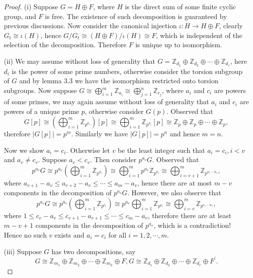 \begin{proof}
(i) Suppose $G=H\oplus F$, where $H$ is the direct sum of some finite cyclic group, and $F$ is free. The existence of such decomposition is guaranteed by previous discussions. Now consider the canonical injection $\iota:H\to H\oplus F$, clearly $G_t\cong\iota(H)$, hence $G/G_t\cong(H\oplus F)/\iota(H)\cong F$, which is independent of the selection of the decomposition. Therefore $F$ is unique up to isomorphism.\par
(ii) We may assume without loss of generality that $G=\mathbb{Z} _{d_1}\oplus \mathbb{Z} _{d_2}\oplus \cdots \oplus \mathbb{Z} _{d_r}$, here $d_i$ is the power of some prime numbers, otherwise consider the torsion subgroup of $G$ and by lemma 3.3 we have the isomorphism restricted onto torsion subgroups. Now suppose $G\cong \bigoplus_{i=1}^m{\mathbb{Z} _{a_i}}\cong \bigoplus_{j=1}^n{\mathbb{Z} _{c_j}}$, where $a_i$ and $c_i$ are powers of some primes, we may again assume without loss of generality that $a_i$ and $c_i$ are powers of a unique prime $p$, otherwise consider $G(p)$. Observed that 
$$
G\left[ p \right] \cong \left( \bigoplus_{i=1}^m{\mathbb{Z} _{p^{a_i}}} \right) \left[ p \right] \cong \bigoplus_{i=1}^m{\mathbb{Z} _{p^{a_i}}\left[ p \right]}\cong \mathbb{Z} _p\oplus \mathbb{Z} _p\oplus \cdots \oplus \mathbb{Z} _p,
$$
therefore $|G[p]|=p^m$. Similarly we have $|G[p]|=p^n$ and hence $m=n$.\par
Now we show $a_i=c_i$. Otherwise let $v$ be the least integer such that $a_i=c_i,i<v$ and $a_v\ne c_v$. Suppose $a_v<c_v$. Then consider $p^{a_v}G$. Observed that 
$$
p^{a_v}G\cong p^{a_v}\left( \bigoplus_{i=1}^m{\mathbb{Z} _{p^{a_i}}} \right) \cong \bigoplus_{i=1}^m{p^{a_v}\mathbb{Z} _{p^{a_i}}}\cong \bigoplus_{i=v+1}^m{\mathbb{Z} _{p^{a_i-a_v}}},
$$
where $a_{v+1}-a_v\le a_{v+2}-a_v\le \cdots \le a_m-a_v$, hence there are at most $m-v$ components in the decomposition of $p^{a_v}G$. However, we also observe that 
$$
p^{a_v}G\cong p^{a_v}\left( \bigoplus_{i=1}^m{\mathbb{Z} _{p^{c_i}}} \right) \cong p^{a_v}\bigoplus_{i=1}^m{\mathbb{Z} _{p^{c_i}}}\cong \bigoplus_{i=v}^m{\mathbb{Z} _{p^{c_i-a_v}}},
$$
where $1\le c_v-a_v\le c_{v+1}-a_{v+1}\le \cdots \le c_m-a_v$, therefore there are at least $m-v+1$ components in the decomposition of $p^{a_v}$, which is a contradiction! Hence no such $v$ exists and $a_i=c_i$ for all $i=1,2,\cdots,m$.\par
(iii) Suppose $G$ has two decompositions, say 
$$
G\cong \mathbb{Z} _{m_1}\oplus \mathbb{Z} _{m_2}\oplus \cdots \oplus \mathbb{Z} _{m_k}\oplus F,G\cong \mathbb{Z} _{d_1}\oplus \mathbb{Z} _{d_2}\oplus \cdots \oplus \mathbb{Z} _{d_r}\oplus F^{\prime}.
$$
\end{proof}
